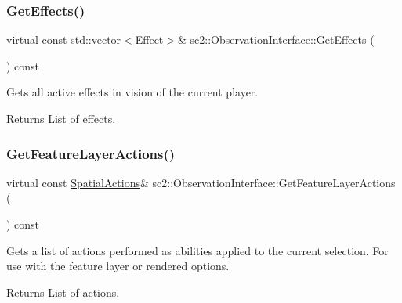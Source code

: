 \subsubsection{\texorpdfstring{Get\+Effects()}{GetEffects()}}
{\footnotesize\ttfamily virtual const std\+::vector$<$\hyperlink{structsc2_1_1_effect}{Effect}$>$\& sc2\+::\+Observation\+Interface\+::\+Get\+Effects (\begin{DoxyParamCaption}{ }\end{DoxyParamCaption}) const\hspace{0.3cm}{\ttfamily [pure virtual]}}

Gets all active effects in vision of the current player. \begin{DoxyReturn}{Returns}
List of effects. 
\end{DoxyReturn}
\mbox{\label{classsc2_1_1_observation_interface_a1e0b5b6e6e6ce0a879c1854b696dcdb0}} 
\subsubsection{\texorpdfstring{Get\+Feature\+Layer\+Actions()}{GetFeatureLayerActions()}}
{\footnotesize\ttfamily virtual const \hyperlink{structsc2_1_1_spatial_actions}{Spatial\+Actions}\& sc2\+::\+Observation\+Interface\+::\+Get\+Feature\+Layer\+Actions (\begin{DoxyParamCaption}{ }\end{DoxyParamCaption}) const\hspace{0.3cm}{\ttfamily [pure virtual]}}

Gets a list of actions performed as abilities applied to the current selection. For use with the feature layer or rendered options. \begin{DoxyReturn}{Returns}
List of actions. 
\end{DoxyReturn}
\mbox{\label{classsc2_1_1_observation_interface_a7fd13a2a776f08f714d941ba9e4bafa8}} 
